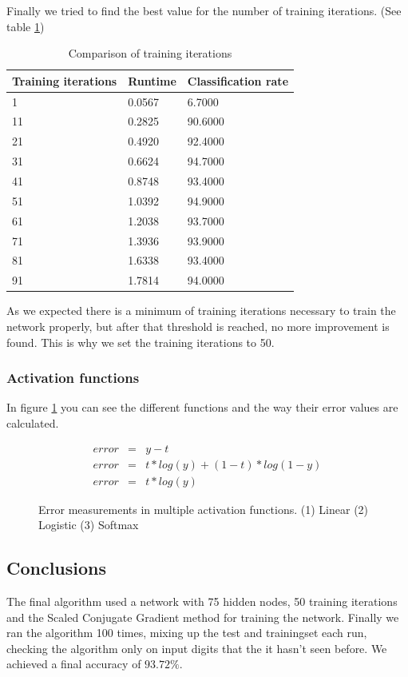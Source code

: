 \documentclass{article}
\begin{document}
\newpage
Finally we tried to find the best value for the number of training iterations. (See table \ref{tab:trainiter})
\begin{table}[H]
	\centering
	\begin{tabular}{| l | l | l |}
		\hline
		Training iterations & Runtime & Classification rate \\ \hline
            1 &   0.0567  &  6.7000 \\ \hline
           11 &   0.2825  & 90.6000 \\ \hline
           21 &   0.4920  & 92.4000 \\ \hline
           31 &   0.6624  & 94.7000 \\ \hline
           41 &   0.8748  & 93.4000 \\ \hline
           51 &   1.0392  & 94.9000 \\ \hline
           61 &   1.2038  & 93.7000 \\ \hline
           71 &   1.3936  & 93.9000 \\ \hline
           81 &   1.6338  & 93.4000 \\ \hline
           91 &   1.7814  & 94.0000 \\ \hline
	\end{tabular}
	\caption{Comparison of training iterations}
	\label{tab:trainiter}
\end{table}

As we expected there is a minimum of training iterations necessary to train the network properly, but after that threshold is reached, no more improvement is found. This is why we set the training iterations to 50.

\subsubsection{Activation functions}
In figure \ref{fig:errormeasure} you can see the different functions and the way their error values are calculated.

\begin{figure}[H]
	\centering
	\begin{eqnarray}
		error & = & y - t \\
		error & = & t * log(y) + (1 - t) * log(1 - y) \\
		error & = & t * log(y)
	\end{eqnarray}
	\caption{Error measurements in multiple activation functions. (1) Linear (2) Logistic (3) Softmax }
    \label{fig:errormeasure}
\end{figure}

\subsection{Conclusions}
The final algorithm used a network with 75 hidden nodes, 50 training iterations and the Scaled Conjugate Gradient method for training the network. Finally we ran the algorithm 100 times, mixing up the test and trainingset each run, checking the algorithm only on input digits that the it hasn't seen before. We achieved a final accuracy of $93.72\%$.
\end{document}
